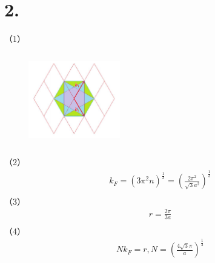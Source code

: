 \documentclass[UTF8]{ctexart}
\begin{document}
\section*{2.}
（1）
\begin{figure}[H]                                         
    \centering                                                
    \includegraphics[width=4cm,height=4cm]{ans-2-1.jpg}        
    \caption*{}                                                                                  
\end{figure}
（2）
\begin{equation*}
    \begin{aligned}
        & k_F=(3\pi^2n)^{\frac{1}{3}}=(\frac{2\pi^2}{\sqrt{3}a^2})^{\frac{1}{3}}\\
    \end{aligned}
\end{equation*}
（3）
\begin{equation*}
    \begin{aligned}
        & r=\frac{2\pi}{3a}\\
    \end{aligned}
\end{equation*}
（4）
\begin{equation*}
    \begin{aligned}
        & Nk_F=r, N=(\frac{4\sqrt{3}\pi}{a})^{\frac{1}{3}}\\
    \end{aligned}
\end{equation*}
\end{document}

